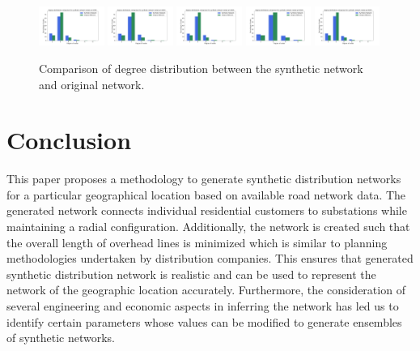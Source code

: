 \documentclass[sigconf]{acmart}
\begin{document}
\begin{figure}[htb]
	\centering
	\includegraphics[width=0.19\textwidth]{figs/34780-degree-dist.png}
	\includegraphics[width=0.19\textwidth]{figs/34810-degree-dist.png}
	\includegraphics[width=0.19\textwidth]{figs/34816-degree-dist.png}
	\includegraphics[width=0.19\textwidth]{figs/28228-degree-dist.png}
	\includegraphics[width=0.19\textwidth]{figs/28235-degree-dist.png}
	\caption{Comparison of degree distribution between the synthetic network and original network.}
	\label{fig:comparison}
\end{figure}

\section{Conclusion}
This paper proposes a methodology to generate synthetic distribution networks for a particular geographical location based on available road network data. The generated network connects individual residential customers to substations while maintaining a radial configuration. Additionally, the network is created such that the overall length of overhead lines is minimized which is similar to planning methodologies undertaken by distribution companies. This ensures that generated synthetic distribution network is realistic and can be used to represent the network of the geographic location accurately. Furthermore, the consideration of several engineering and economic aspects in inferring the network has led us to identify certain parameters whose values can be modified to generate ensembles of synthetic networks.
\end{document}
